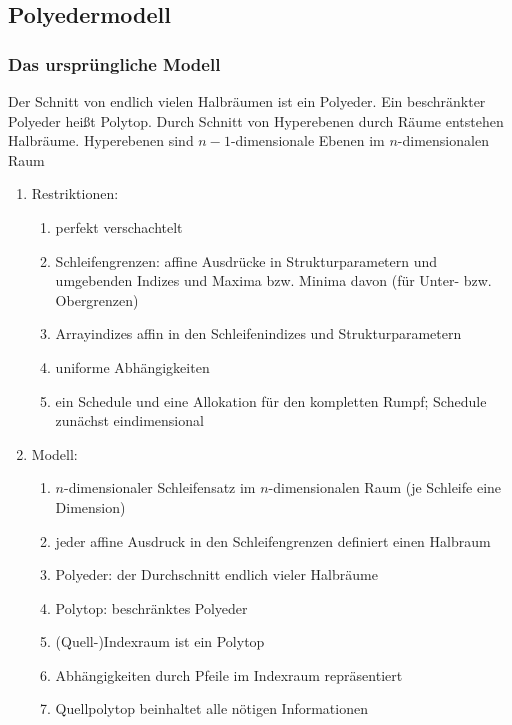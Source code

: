 \subsection{Polyedermodell}
\label{sec:polymod}

\subsubsection{Das ursprüngliche Modell}
\label{sec:orig-mod}

Der Schnitt von endlich vielen Halbräumen ist ein Polyeder.
Ein beschränkter Polyeder heißt Polytop.
Durch Schnitt von Hyperebenen durch Räume entstehen Halbräume.
Hyperebenen sind $n-1$-dimensionale Ebenen im $n$-dimensionalen Raum

\begin{enumerate}
\item Restriktionen:
\begin{enumerate}
\item perfekt verschachtelt
\item Schleifengrenzen: affine Ausdrücke in Strukturparametern und umgebenden
  Indizes und Maxima bzw. Minima davon (für Unter- bzw. Obergrenzen)
\item Arrayindizes affin in den Schleifenindizes und Strukturparametern
\item uniforme Abhängigkeiten
\item ein Schedule und eine Allokation für den kompletten Rumpf;
  Schedule zunächst eindimensional
\end{enumerate}
%
\item Modell:
\begin{enumerate}
\item $n$-dimensionaler Schleifensatz im $n$-dimensionalen Raum (je
  Schleife eine Dimension)
\item jeder affine Ausdruck in den Schleifengrenzen definiert einen
  Halbraum
\item Polyeder: der Durchschnitt endlich vieler Halbräume
\item Polytop: beschränktes Polyeder
\item (Quell-)Indexraum ist ein Polytop
\item Abhängigkeiten durch Pfeile im Indexraum repräsentiert
\item Quellpolytop beinhaltet alle nötigen Informationen
\end{enumerate}

\end{enumerate}
